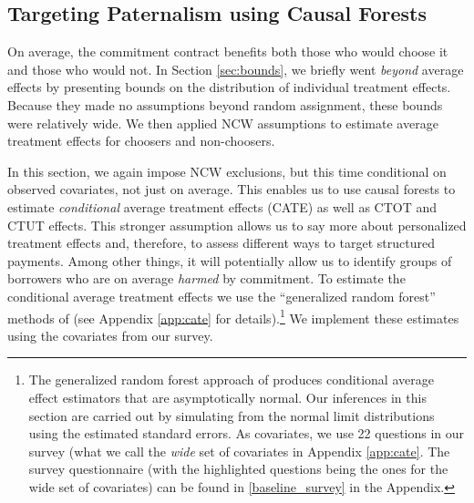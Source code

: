 \documentclass[12pt, a4paper]{article}
\begin{document}
\subsection{Targeting Paternalism using Causal Forests} \label{sec:RF}


On average, the commitment contract benefits both those who would choose it and those who would not.
In Section \ref{sec:bounds}, we briefly went \emph{beyond} average effects by presenting bounds on the distribution of individual treatment effects.
Because they made no assumptions beyond random assignment, these bounds were relatively wide.
We then applied NCW assumptions to estimate average treatment effects for choosers and non-choosers. 

In this section, we again impose NCW exclusions, but this time conditional on observed covariates, not just on average. This enables us to use causal forests to estimate \textit{conditional} average treatment effects (CATE) as well as CTOT and CTUT effects. This stronger assumption allows us to say more about personalized treatment effects and, therefore, to assess different ways to target structured payments.  %
Among other things, it will potentially allow us to identify groups of borrowers who are on average \emph{harmed} by commitment.
To estimate the conditional average treatment effects we use the ``generalized random forest'' methods of \cite{atheygrf} (see Appendix \ref{app:cate} for details).\footnote{The generalized random forest approach of \cite{atheygrf} produces conditional average effect estimators that are asymptotically normal.
Our inferences in this section are carried out by simulating from the normal limit distributions using the estimated standard errors. As covariates, we use 22 questions in our survey (what we call the \textit{wide} set of covariates in Appendix \ref{app:cate}. The survey questionnaire (with the highlighted questions being the ones for the wide set of covariates) can be found in \ref{baseline_survey} in the Appendix.} 
We implement these estimates using the covariates from our survey.
\end{document}

